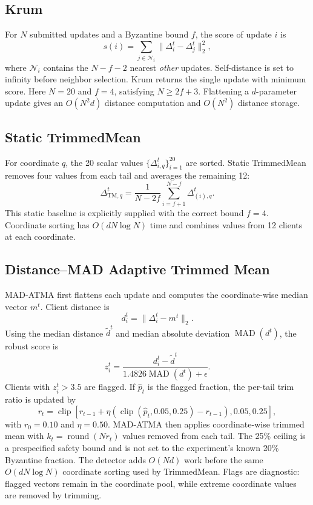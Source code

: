 \documentclass[10pt,letterpaper]{article}
\begin{document}
\subsection{Krum}

For $N$ submitted updates and a Byzantine bound $f$, the score of update $i$ is
\begin{equation}
s(i)=\sum_{j\in\mathcal{N}_i}\|\Delta_i^t-\Delta_j^t\|_2^2,
\end{equation}
where $\mathcal{N}_i$ contains the $N-f-2$ nearest \emph{other} updates.
Self-distance is set to infinity before neighbor selection. Krum returns the
single update with minimum score. Here $N=20$ and $f=4$, satisfying
$N\geq2f+3$. Flattening a $d$-parameter update gives an
$O(N^2d)$ distance computation and $O(N^2)$ distance storage.

\subsection{Static TrimmedMean}

For coordinate $q$, the 20 scalar values
$\{\Delta_{i,q}^t\}_{i=1}^{20}$ are sorted. Static TrimmedMean removes four
values from each tail and averages the remaining 12:
\begin{equation}
\Delta_{\mathrm{TM},q}^t=
\frac{1}{N-2f}\sum_{i=f+1}^{N-f}\Delta_{(i),q}^t.
\end{equation}
This static baseline is explicitly supplied with the correct bound $f=4$.
Coordinate sorting has $O(dN\log N)$ time and combines values from 12 clients
at each coordinate.

\subsection{Distance--MAD Adaptive Trimmed Mean}

MAD-ATMA first flattens each update and computes the coordinate-wise median
vector $m^t$. Client distance is
\begin{equation}
d_i^t=\|\Delta_i^t-m^t\|_2.
\end{equation}
Using the median distance $\widetilde d^t$ and median absolute deviation
$\operatorname{MAD}(d^t)$, the robust score is
\begin{equation}
z_i^t =
\frac{d_i^t-\widetilde d^t}
{1.4826\operatorname{MAD}(d^t)+\epsilon}.
\end{equation}
Clients with $z_i^t>3.5$ are flagged. If $\widehat p_t$ is the flagged fraction,
the per-tail trim ratio is updated by
\begin{equation}
r_t=\operatorname{clip}\left[
r_{t-1}+\eta\left(
\operatorname{clip}(\widehat p_t,0.05,0.25)-r_{t-1}
\right),0.05,0.25\right],
\end{equation}
with $r_0=0.10$ and $\eta=0.50$. MAD-ATMA then applies coordinate-wise trimmed
mean with $k_t=\operatorname{round}(Nr_t)$ values removed from each tail. The
25\% ceiling is a prespecified safety bound and is not set to the experiment's
known 20\% Byzantine fraction. The detector adds $O(Nd)$ work before the same
$O(dN\log N)$ coordinate sorting used by TrimmedMean. Flags are diagnostic:
flagged vectors remain in the coordinate pool, while extreme coordinate values
are removed by trimming.
\end{document}
